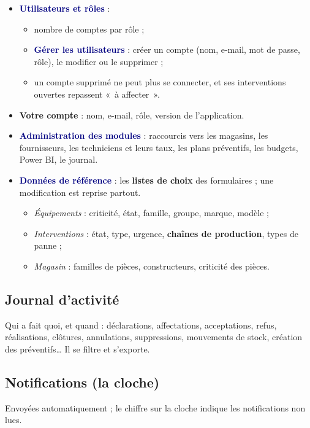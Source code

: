 \documentclass[11pt,a4paper]{article}
\newcommand{\ui}[1]{\textbf{\textcolor{navy}{#1}}}          %
\begin{document}
\begin{itemize}
  \item \ui{Utilisateurs et rôles} :
    \begin{itemize}
      \item nombre de comptes par rôle ;
      \item \ui{Gérer les utilisateurs} : créer un compte (nom, e-mail, mot de passe, rôle), le modifier ou le supprimer ;
      \item un compte supprimé ne peut plus se connecter, et ses interventions ouvertes repassent «~à affecter~».
    \end{itemize}
  \item \textbf{Votre compte} : nom, e-mail, rôle, version de l'application.
  \item \ui{Administration des modules} : raccourcis vers les magasins, les fournisseurs, les techniciens et leurs taux, les plans préventifs, les budgets, Power BI, le journal.
  \item \ui{Données de référence} : les \textbf{listes de choix} des formulaires ; une modification est reprise partout.
    \begin{itemize}
      \item \emph{Équipements} : criticité, état, famille, groupe, marque, modèle ;
      \item \emph{Interventions} : état, type, urgence, \textbf{chaînes de production}, types de panne ;
      \item \emph{Magasin} : familles de pièces, constructeurs, criticité des pièces.
    \end{itemize}
\end{itemize}

\subsection{Journal d'activité}

Qui a fait quoi, et quand : déclarations, affectations, acceptations, refus, réalisations, clôtures, annulations, suppressions, mouvements de stock, création des préventifs\ldots{} Il se filtre et s'exporte.

\subsection{Notifications (la cloche)}

Envoyées automatiquement ; le chiffre sur la cloche indique les notifications non lues.
\end{document}
